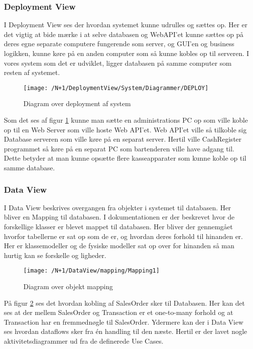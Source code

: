 \subsubsection{Deployment View}
I Deployment View ses der hvordan systemet kunne udrulles og sættes op. Her er det vigtig at bide mærke i at selve databasen og \gls{WebAPI}'et kunne sættes op på deres egne separate computere fungerende som server, og GUI'en og business logikken, kunne køre på en anden computer som så kunne kobles op til serveren. I vores system som det er udviklet, ligger databasen på samme computer som resten af systemet. \newline\newline
\begin{figure}[H]
	\centering
	\texttt{[image: /N+1/DeploymentView/System/Diagrammer/DEPLOY]}
	\caption{Diagram over deployment af system}
	\label{fig:DeplayDia}
\end{figure}
Som det ses af figur \ref{fig:DeplayDia} kunne man sætte en administrations PC op som ville koble op til en Web Server som ville hoste Web API'et. Web API'et ville så tilkoble sig Database serveren som ville køre på en separat server. Hertil ville CashRegister programmet så køre på en separat PC som bartenderen ville have adgang til. Dette betyder at man kunne opsætte flere kasseapparater som kunne koble op til samme database.  

\subsubsection{Data View}
I Data View beskrives overgangen fra objekter i systemet til databasen. Her bliver en Mapping til databasen.\newline\newline
I dokumentationen er der beskrevet hvor de forskellige klasser er blevet mappet til databasen. Her bliver der gennemgået hvorfor tabellerne er sat op som de er, og hvordan deres forhold til hinanden er. Her er klassemodeller og de fysiske modeller sat op over for hinanden så man hurtig kan se forskelle og ligheder.

\begin{figure}[H]
	\centering
	\texttt{[image: /N+1/DataView/mapping/Mapping1]}
	\caption{Diagram over objekt mapping}
	\label{MapDia}
\end{figure}	

På figur \ref{MapDia} ses det hvordan kobling af SalesOrder sker til Databasen. Her kan det ses at der mellem SalesOrder og Transaction er et one-to-many forhold og at Transaction har en fremmednøgle til SalesOrder.\newline\newline
Ydermere kan der i Data View ses hvordan dataflows sker fra én handling til den næste. Hertil er der lavet nogle aktivitetsdiagrammer ud fra de definerede Use Cases. 

